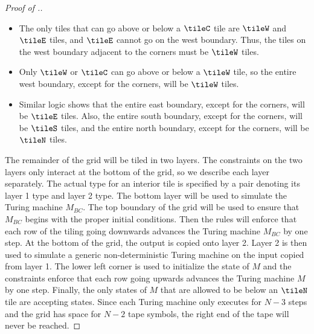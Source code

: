 \begin{proof}[Proof of .]
\begin{itemize}
\item The only tiles that can go above or below a $\tileC$ tile are $\tileW$ and $\tileE$ tiles, and
$\tileE$ cannot go on the west boundary.  Thus, the tiles on the west boundary adjacent to the corners
must be $\tileW$ tiles.

\item Only $\tileW$ or $\tileC$ can go above or below a $\tileW$ tile, so the entire west boundary, except for the corners, will be $\tileW$ tiles.

\item Similar logic shows that the entire east boundary, except for the corners, will be $\tileE$ tiles.  Also, the entire south boundary, except for the corners, will be $\tileS$ tiles, and the entire north boundary, except for the corners, will be $\tileN$ tiles.

\end{itemize}

The remainder of the grid will be tiled in two layers.
The constraints on the two layers only interact at the bottom of the grid, so
we describe each layer separately. The actual type for an
interior tile is specified by a pair denoting its
layer 1 type and layer 2 type.
The bottom layer will be used to simulate the Turing machine $M_{BC}$.
The top boundary of the grid will be used to ensure that $M_{BC}$
begins with the proper initial conditions. Then the rules will enforce that
each row of the tiling going downwards advances the Turing machine $M_{BC}$
by one step. At the bottom of the grid, the output is copied onto layer 2.
Layer 2 is then used to simulate a generic non-deterministic Turing machine
on the input copied from layer 1. The lower left corner is used to
initialize the state of $M$ and the constraints enforce that
each row going upwards advances the Turing machine $M$ by one step.
Finally, the only states of $M$ that are allowed to be below an $\tileN$ tile
are accepting states.
Since each Turing machine only executes for $N-3$ steps and the grid has space
for $N-2$ tape symbols, the right end of the tape will never be reached.




\end{proof}
